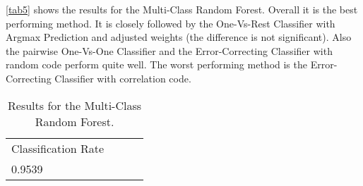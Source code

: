 \documentclass{article}
\begin{document}
\autoref{tab5} shows the results for the Multi-Class Random Forest.
Overall it is the best performing method. It is closely followed by the One-Vs-Rest Classifier with Argmax Prediction and adjusted weights (the difference is not significant). Also the pairwise One-Vs-One Classifier and the Error-Correcting Classifier with random code perform quite well. 
The worst performing method is the Error-Correcting Classifier with correlation code.

\begin{table}[h]
	\centering
	\begin{tabular}{l c c c}
        Classification Rate \\
        0.9539              \\
    \end{tabular}
	\caption{Results for the Multi-Class Random Forest.}
	\label{tab5}
\end{table}
\end{document}

